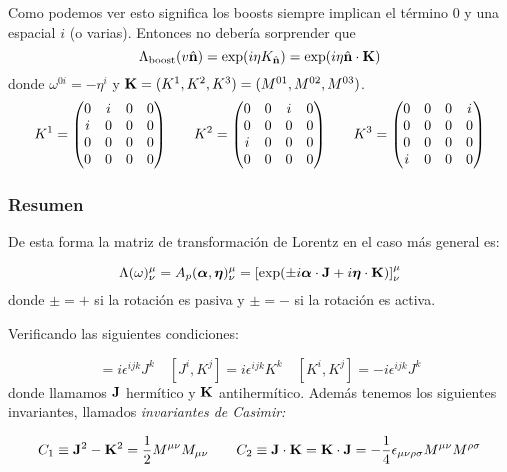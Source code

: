 Como podemos ver esto significa los boosts siempre implican el término 0 y una espacial $i$ (o varias). Entonces no debería sorprender que 
\begin{equation}
	\Lambda_{ \text{boost}}   (v\hat{\mathbf{n}}) = \exp(i\eta K_{\hat{\mathbf{n}}}) =  \exp(i\eta \hat{\mathbf{n}}\cdot \mathbf{K})
\end{equation}
donde $\omega^{0i}=-\eta^i$ y $\mathbf{K}=(K^1,K^2,K^3)=(M^{01},M^{02},M^{03})$.
\begin{equation}
	K^1=\mqty(0&i&0&0\\i&0&0&0\\0&0&0&0\\0&0&0&0) \qquad K^2=\mqty(0&0&i&0\\0&0&0&0\\i&0&0&0\\0&0&0&0) \qquad K^3=\mqty(0&0&0&i\\0&0&0&0\\0&0&0&0\\i&0&0&0)
\end{equation}




\subsubsection{Resumen}


\begin{teorema}
	De esta forma la matriz de transformación de Lorentz en el caso más general es:
	
	\begin{equation}
		\Lambda(\omega)^{\mu}_\nu = A_p(\boldsymbol{\alpha},\boldsymbol{\eta})^\mu_\nu = \left[ \exp(\pm i\boldsymbol{\alpha}\cdot\mathbf{J} + i \boldsymbol{\eta}\cdot\mathbf{K}) \right]_\nu^\mu
	\end{equation}
	donde $\pm=+$ si la rotación es pasiva y $\pm=-$ si la rotación es activa.
\end{teorema}
Verificando las siguientes condiciones:

\begin{equation}
	[J^i,J^j]=i\epsilon^{ijk}J^k \quad [J^i,K^j]=i\epsilon^{ijk}K^k \quad [K^i,K^j]=-i\epsilon^{ijk}J^k
\end{equation}
donde llamamos $\mathbf{J}$ hermítico y $\mathbf{K}$ antihermítico. Además tenemos los siguientes invariantes, llamados \textit{invariantes de Casimir:}

\begin{equation}
	C_1\equiv \mathbf{J}^2-\mathbf{K}^2 = \frac{1}{2}M^{\mu \nu}M_{\mu \nu}\qquad C_2 \equiv \mathbf{J}\cdot\mathbf{K}=\mathbf{K}\cdot\mathbf{J}=-\frac{1}{4} \epsilon_{\mu \nu\rho\sigma}M^{\mu \nu}M^{\rho \sigma}
\end{equation}

